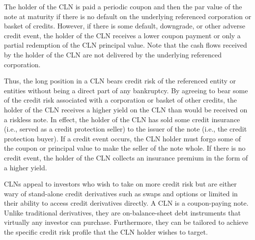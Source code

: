 \documentclass[11pt]{article}
\begin{document}
The holder of the CLN is paid a periodic coupon and then the par value of the note at maturity if there is no default on the underlying referenced corporation or basket of credits. However, if there is some default, downgrade, or other adverse credit event, the holder of the CLN receives a lower coupon payment or only a partial redemption of the CLN principal value. Note that the cash flows received by the holder of the CLN are not delivered by the underlying referenced corporation.

Thus, the long position in a CLN bears credit risk of the referenced entity or entities without being a direct part of any bankruptcy. By agreeing to bear some of the credit risk associated with a corporation or basket of other credits, the holder of the CLN receives a higher yield on the CLN than would be received on a riskless note. In effect, the holder of the CLN has sold some credit insurance (i.e., served as a credit protection seller) to the issuer of the note (i.e., the credit protection buyer). If a credit event occurs, the CLN holder must forgo some of the coupon or principal value to make the seller of the note whole. If there is no credit event, the holder of the CLN collects an insurance premium in the form of a higher yield.

CLNs appeal to investors who wish to take on more credit risk but are either wary of stand-alone credit derivatives such as swaps and options or limited in their ability to access credit derivatives directly. A CLN is a coupon-paying note. Unlike traditional derivatives, they are on-balance-sheet debt instruments that virtually any investor can purchase. Furthermore, they can be tailored to achieve the specific credit risk profile that the CLN holder wishes to target.
\end{document}
